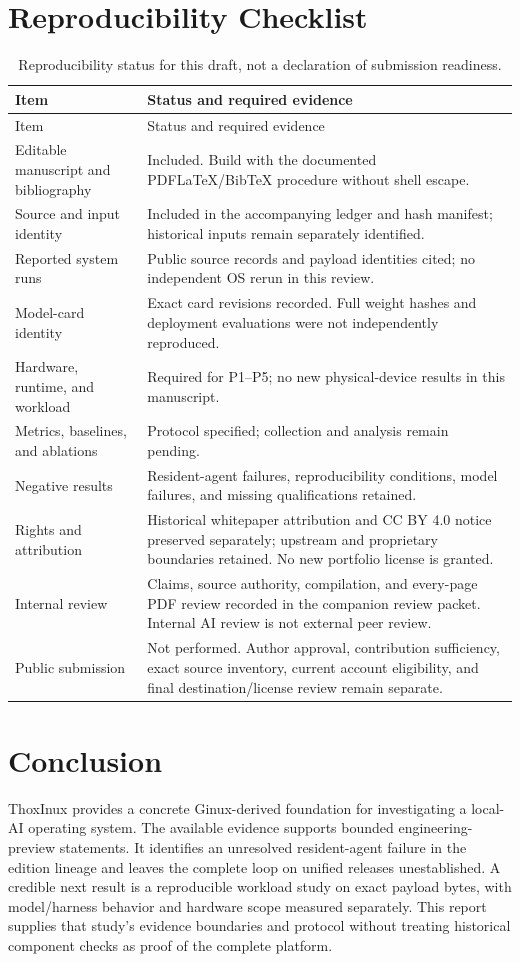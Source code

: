 \documentclass[11pt,a4paper]{article}
\begin{document}
\section{Reproducibility Checklist}
\begin{longtable}{P{0.34\textwidth}P{0.59\textwidth}}
\caption{Reproducibility status for this draft, not a declaration of submission readiness.}\\
\toprule Item & Status and required evidence \\
\midrule
\endfirsthead
\toprule Item & Status and required evidence \\
\midrule
\endhead
Editable manuscript and bibliography & Included. Build with the documented PDFLaTeX/BibTeX procedure without shell escape. \\
Source and input identity & Included in the accompanying ledger and hash manifest; historical inputs remain separately identified. \\
Reported system runs & Public source records and payload identities cited; no independent OS rerun in this review. \\
Model-card identity & Exact card revisions recorded. Full weight hashes and deployment evaluations were not independently reproduced. \\
Hardware, runtime, and workload & Required for P1--P5; no new physical-device results in this manuscript. \\
Metrics, baselines, and ablations & Protocol specified; collection and analysis remain pending. \\
Negative results & Resident-agent failures, reproducibility conditions, model failures, and missing qualifications retained. \\
Rights and attribution & Historical whitepaper attribution and CC BY 4.0 notice preserved separately; upstream and proprietary boundaries retained. No new portfolio license is granted. \\
Internal review & Claims, source authority, compilation, and every-page PDF review recorded in the companion review packet. Internal AI review is not external peer review. \\
Public submission & Not performed. Author approval, contribution sufficiency, exact source inventory, current account eligibility, and final destination/license review remain separate. \\
\bottomrule
\end{longtable}

\section*{Conclusion}
ThoxInux provides a concrete Ginux-derived foundation for investigating a local-AI operating system. The available evidence supports bounded engineering-preview statements. It identifies an unresolved resident-agent failure in the edition lineage and leaves the complete loop on unified releases unestablished. A credible next result is a reproducible workload study on exact payload bytes, with model/harness behavior and hardware scope measured separately. This report supplies that study's evidence boundaries and protocol without treating historical component checks as proof of the complete platform.
\end{document}
